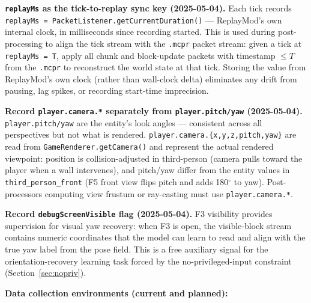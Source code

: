 \documentclass[11pt,a4paper]{article}
\begin{document}
\begin{designdecision}
\textbf{\texttt{replayMs} as the tick-to-replay sync key (2025-05-04).} Each tick records \texttt{replayMs = PacketListener.getCurrentDuration()} --- ReplayMod's own internal clock, in milliseconds since recording started. This is used during post-processing to align the tick stream with the \texttt{.mcpr} packet stream: given a tick at \texttt{replayMs = T}, apply all chunk and block-update packets with timestamp $\leq T$ from the \texttt{.mcpr} to reconstruct the world state at that tick. Storing the value from ReplayMod's own clock (rather than wall-clock delta) eliminates any drift from pausing, lag spikes, or recording start-time imprecision.
\end{designdecision}

\begin{designdecision}
\textbf{Record \texttt{player.camera.*} separately from \texttt{player.pitch/yaw} (2025-05-04).} \texttt{player.pitch/yaw} are the entity's look angles --- consistent across all perspectives but not what is rendered. \texttt{player.camera.\{x,y,z,pitch,yaw\}} are read from \texttt{GameRenderer.getCamera()} and represent the actual rendered viewpoint: position is collision-adjusted in third-person (camera pulls toward the player when a wall intervenes), and pitch/yaw differ from the entity values in \texttt{third\_person\_front} (F5 front view flips pitch and adds 180$^\circ$ to yaw). Post-processors computing view frustum or ray-casting must use \texttt{player.camera.*}.
\end{designdecision}

\begin{designdecision}
\textbf{Record \texttt{debugScreenVisible} flag (2025-05-04).} F3 visibility provides supervision for visual yaw recovery: when F3 is open, the visible-block stream contains numeric coordinates that the model can learn to read and align with the true yaw label from the pose field. This is a free auxiliary signal for the orientation-recovery learning task forced by the no-privileged-input constraint (Section~\ref{sec:nopriv}).
\end{designdecision}

\textbf{Data collection environments (current and planned):}
\end{document}
